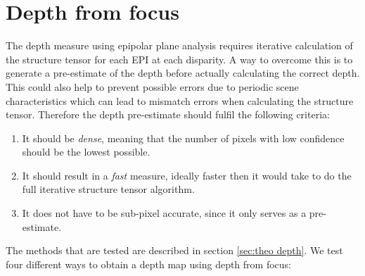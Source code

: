 \documentclass  [
  paper    = a4,
  BCOR     = 10mm,
  twoside,
  fontsize = 12pt,
  fleqn,
  toc      = bibnumbered,
  toc      = listofnumbered,
  numbers  = noendperiod,
  headings = normal,
  listof   = leveldown,
  version  = 3.03
]                                       {scrreprt}
\begin{document}
\section{Depth from focus}
\label{sec: depth from focus}
The depth measure using epipolar plane analysis requires iterative calculation of the structure tensor for each EPI at each disparity. A way to overcome this is to generate a pre-estimate of the depth before actually calculating the correct depth. This could also help to prevent possible errors due to periodic scene characteristics which can lead to mismatch errors when calculating the structure tensor. Therefore the depth pre-estimate should fulfil the following criteria:
\begin{enumerate}
	\item It should be \textit{dense}, meaning that the number of pixels with low confidence should be the lowest possible.
	\item It should result in a \textit{fast} measure, ideally faster then it would take to do the full iterative structure tensor algorithm.
	\item It does not have to be sub-pixel accurate, since it only serves as a pre-estimate. 
\end{enumerate}
The methods that are tested are described in section \ref{sec:theo depth}. We test four different ways to obtain a depth map using depth from focus:
\end{document}
